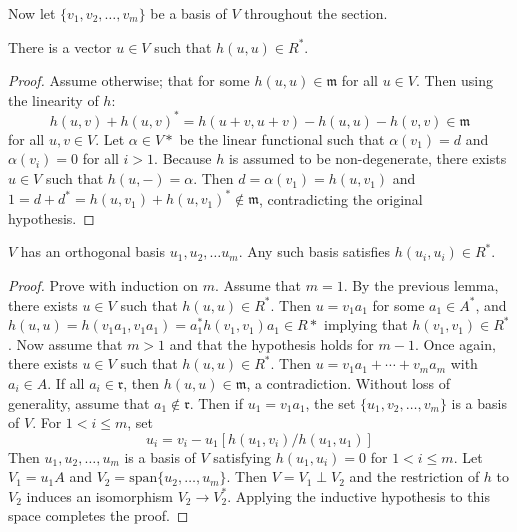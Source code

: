 \documentclass[11pt]{article}
\begin{document}
Now let $\{v_1, v_2, \dotsc, v_m\}$ be a basis of $V$ throughout the section.

\begin{lemma}
There is a vector $u \in V$ such that $h(u,u) \in R^*$.
\end{lemma}
\begin{proof}
Assume otherwise; that for some $h(u,u) \in \mathfrak{m}$ for all $u \in V$.
Then using the linearity of $h$:
\[
h(u,v) + h(u,v)^* = h(u+v, u+v) - h(u,u) - h(v,v) \in \mathfrak{m}
\]
for all $u,v \in V$.
Let $\alpha \in V*$ be the linear functional such that $\alpha(v_1) = d$ and $\alpha(v_i) = 0$ for all $i > 1$.
Because $h$ is assumed to be non-degenerate, there exists $u \in V$ such that $h(u,-) = \alpha$.
Then $d = \alpha(v_1) = h(u,v_1)$ and $1 = d + d^* = h(u,v_1) + h(u,v_1)^* \not\in \mathfrak{m}$, contradicting the original hypothesis.
\end{proof}

\begin{lemma}\label{lemma2.2}
$V$ has an orthogonal basis $u_1, u_2, \dotsc u_m$.
Any such basis satisfies $h(u_i, u_i) \in R^*$.
\end{lemma}
\begin{proof}
Prove with induction on $m$.
Assume that $m = 1$.
By the previous lemma, there exists $u \in V$ such that $h(u,u) \in R^*$.
Then $u = v_1a_1$ for some $a_1 \in A^*$, and $h(u,u) = h(v_1a_1, v_1a_1) = a_1^*h(v_1,v_1)a_1 \in R*$ implying that $h(v_1, v_1) \in R^*$.
Now assume that $m > 1$ and that the hypothesis holds for $m - 1$.
Once again, there exists $u \in V$ such that $h(u,u) \in R^*$.
Then $u = v_1a_1 + \dotsb + v_m a_m$ with $a_i \in A$.
If all $a_i \in \mathfrak{r}$, then $h(u,u) \in \mathfrak{m}$, a contradiction.
Without loss of generality, assume that $a_1 \not\in \mathfrak{r}$.
Then if $u_1 = v_1 a_1$, the set $\{u_1, v_2, \dotsc, v_m\}$ is a basis of $V$.
For $1 < i \le m$, set
\[
u_i = v_i - u_1[h(u_1,v_i)/h(u_1, u_1)]
\]
Then $u_1, u_2, \dotsc, u_m$ is a basis of $V$ satisfying $h(u_1, u_i) = 0$ for $1 < i \le m$.
Let $V_1 = u_1 A$ and $V_2 = \text{span} \{u_2, \dotsc, u_m\}$.
Then $V = V_1 \perp V_2$ and the restriction of $h$ to $V_2$ induces an isomorphism $V_2 \to V_2^*$.
Applying the inductive hypothesis to this space completes the proof.
\end{proof}
\end{document}
